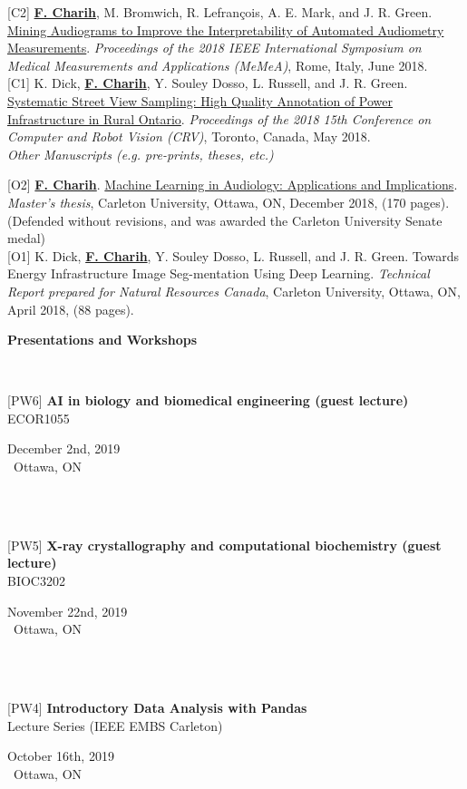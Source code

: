 \documentclass[11pt]{article}
\newcommand{\siteurl}[2]{{\href{#2}{\textcolor{quebecblue}{#1}}}}
\newcommand{\header}[1]{\begin{center}{\large \sc \bf #1}\end{center}\\}
\newcommand{\poster}[6]{
	\begin{minipage}[t]{0.8\textwidth}
	[#5#6] {\bf #1}\\
	#2
\end{minipage}
\begin{minipage}[t]{0.2\textwidth}
	\flushright
	#4\\
	\faMapMarker\ #3
\end{minipage}\\
}
\begin{document}
[C2] \textbf{{\underline{{F. Charih}}}}, M. Bromwich, R. Lefrançois, A. E. Mark, and J. R. Green. \siteurl{Mining Audiograms to Improve the Interpretability of Automated Audiometry Measurements}{https://doi.org/10.1109/MeMeA.2018.8438746}. \textit{Proceedings of the 2018 IEEE International Symposium on Medical Measurements and Applications (MeMeA)}, Rome, Italy, June 2018.\\


[C1] K. Dick, \textbf{{\underline{{F. Charih}}}}, Y. Souley Dosso, L. Russell, and J. R. Green. \siteurl{Systematic Street View Sampling: High Quality Annotation of Power Infrastructure in Rural Ontario}{https://doi.org/10.1109/CRV.2018.00028}. \textit{Proceedings of the 2018 15th Conference on Computer and Robot Vision (CRV)}, Toronto, Canada, May 2018.\\



\textit{Other Manuscripts (e.g. pre-prints, theses, etc.)}\\

\nopagebreak

[O2] \textbf{{\underline{{F. Charih}}}}. \siteurl{Machine Learning in Audiology: Applications and Implications}{https://curve.carleton.ca/873548bb-f077-49d4-a5a6-9a69fddf1284}. \textit{Master's thesis}, Carleton University, Ottawa, ON, December 2018, (170 pages).  (Defended without revisions, and was awarded the Carleton University Senate medal)\\


[O1] K. Dick, \textbf{{\underline{{F. Charih}}}}, Y. Souley Dosso, L. Russell, and J. R. Green. Towards Energy Infrastructure Image Seg-mentation Using Deep Learning. \textit{Technical Report prepared for Natural Resources Canada}, Carleton University, Ottawa, ON, April 2018, (88 pages). \\


\header{Presentations and Workshops}

\nopagebreak

\poster{AI in biology and biomedical engineering (guest lecture)}{ECOR1055}{Ottawa, ON}{December 2nd, 2019}{PW}{6}\\


\poster{X-ray crystallography and computational biochemistry (guest lecture)}{BIOC3202}{Ottawa, ON}{November 22nd, 2019}{PW}{5}\\


\poster{Introductory Data Analysis with Pandas}{Lecture Series (IEEE EMBS Carleton)}{Ottawa, ON}{October 16th, 2019}{PW}{4}\\
\end{document}
